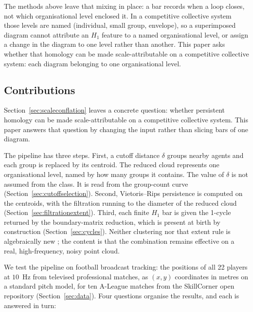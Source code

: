 The methods above leave that mixing in place: a bar records when a loop
closes, not which organisational level enclosed it. In a competitive
collective system those levels are named (individual, small group,
envelope), so a superimposed diagram cannot attribute an $H_1$ feature
to a named organisational level, or assign a change in the diagram to
one level rather than another. This paper asks whether that homology
can be made scale-attributable on a competitive collective system:
each diagram belonging to one organisational level.

\subsection{Contributions}

Section~\ref{sec:scaleconflation} leaves a concrete question: whether
persistent homology can be made scale-attributable on a competitive
collective system. This paper answers that question by changing the
input rather than slicing bars of one diagram.

The pipeline has three steps. First, a cutoff distance $\delta$ groups nearby agents and each group is replaced by its centroid. The reduced cloud represents one organisational level, named by how many groups it contains. The value of $\delta$ is not assumed from the class. It is read from the group-count curve (Section~\ref{sec:cutoffselection}). Second, Vietoris--Rips persistence is computed on the centroids, with the filtration running to the diameter of the reduced cloud (Section~\ref{sec:filtrationextent}). Third, each finite $H_1$ bar is given the 1-cycle returned by the boundary-matrix reduction, which is present at birth by construction (Section~\ref{sec:cycles}). Neither clustering
nor that extent rule is algebraically new
\citep{carlsson2010clustering,schindler2023}; the content is that the
combination remains effective on a real, high-frequency, noisy point
cloud.

We test the pipeline on football broadcast tracking: the positions of
all 22 players at $10$~Hz from televised professional matches, as
$(x,y)$ coordinates in metres on a standard pitch model, for ten
A-League matches from the SkillCorner open repository
(Section~\ref{sec:data}). Four questions organise the results, and each
is answered in turn:

